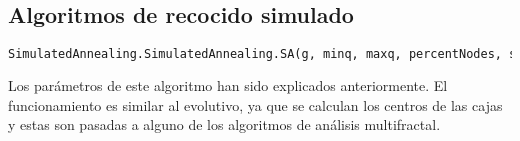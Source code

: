 \subsection{Algoritmos de recocido simulado}

\begin{lstlisting}[language=python]
SimulatedAnnealing.SimulatedAnnealing.SA(g, minq, maxq, percentNodes, sizePopulation, Kmax, typeAlgorithm)
\end{lstlisting}

Los parámetros de este algoritmo han sido explicados anteriormente. El funcionamiento es similar al evolutivo, ya que se calculan los centros de las cajas y estas son pasadas a alguno de los algoritmos de análisis multifractal.